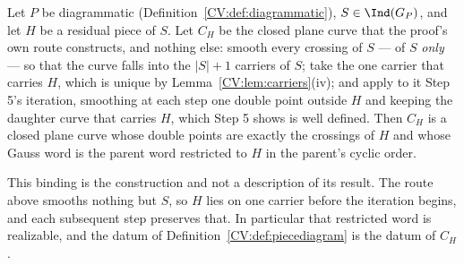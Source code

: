 \begin{lemma}
\label{CV:lem:piececurve}\leanok
Let $P$ be diagrammatic (Definition~\ref{CV:def:diagrammatic}),
$S\in\Ind(G_P)$, and let $H$ be a residual piece of $S$. Let $C_H$ be the closed
plane curve that the proof's own route constructs, and nothing else: smooth
every crossing of $S$ --- of $S$ \emph{only} --- so that the curve falls into
the $|S|+1$ carriers of $S$; take the one carrier that carries $H$, which is
unique by Lemma~\ref{CV:lem:carriers}(iv); and apply to it Step 5's iteration,
smoothing at each step one double point outside $H$ and keeping the daughter
curve that carries $H$, which Step 5 shows is well defined. Then $C_H$ is a
closed plane curve whose double points are exactly the crossings of $H$ and
whose Gauss word is the parent word restricted to $H$ in the parent's cyclic
order.

This binding is the construction and not a description of its result. The
route above smooths nothing but $S$, so $H$ lies on one carrier before the
iteration begins, and each subsequent step preserves that. In particular that restricted word is realizable, and the datum of
Definition~\ref{CV:def:piecediagram} is the datum of $C_H$.
\end{lemma}
